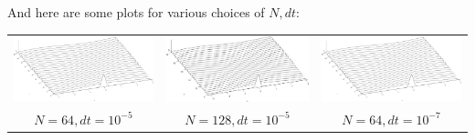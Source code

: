 \documentclass{article}
\begin{document}
And here are some plots for various choices of $N, dt$:

\begin{center}
\begin{tabular}{ccc}
\includegraphics[width=2in]{plot5_1.png}  & \includegraphics[width=2in]{plot5_2.png} & \includegraphics[width=2in]{plot5_3.png} \\
$N=64, dt=10^{-5}$ & $N=128, dt=10^{-5}$ & $N=64, dt=10^{-7}$ \\
\end{tabular}
\end{center}
\end{document}
